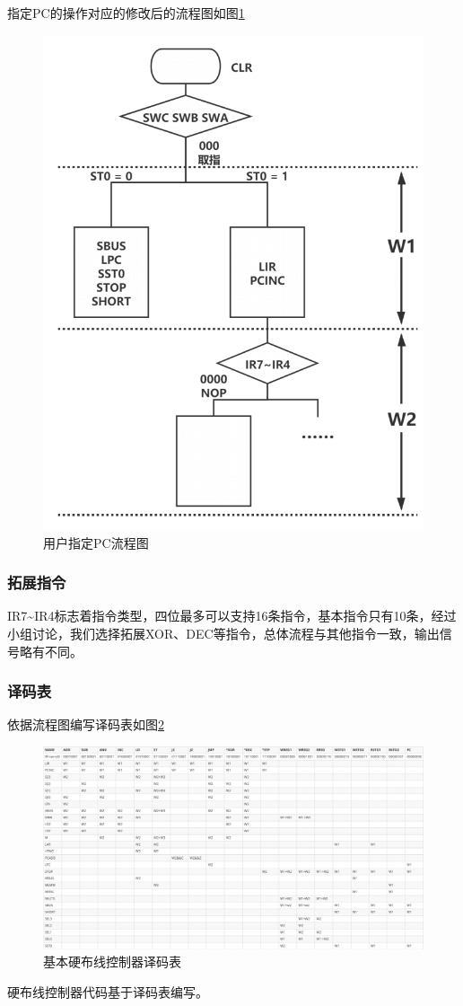 指定PC的操作对应的修改后的流程图如图\ref{fig:pc_modifier}
\begin{figure}[htbp]
    \centering
    \includegraphics[width=0.7\linewidth]{figures/chapter2/PC_modifier.png}
    \caption{用户指定PC流程图}
    \label{fig:pc_modifier}
\end{figure}

\subsubsection{拓展指令}
IR7\~{}IR4标志着指令类型，四位最多可以支持16条指令，基本指令只有10条，经过小组讨论，我们选择拓展XOR、DEC等指令，总体流程与其他指令一致，输出信号略有不同。

\subsubsection{译码表}
依据流程图编写译码表如图\ref{fig:decoding_table}

\begin{figure}[htbp]
    \centering
    \includegraphics[width=0.9\linewidth]{figures/chapter2/decoding_table.png}
    \caption{基本硬布线控制器译码表}
    \label{fig:decoding_table}
\end{figure}

硬布线控制器代码基于译码表编写。
\clearpage
